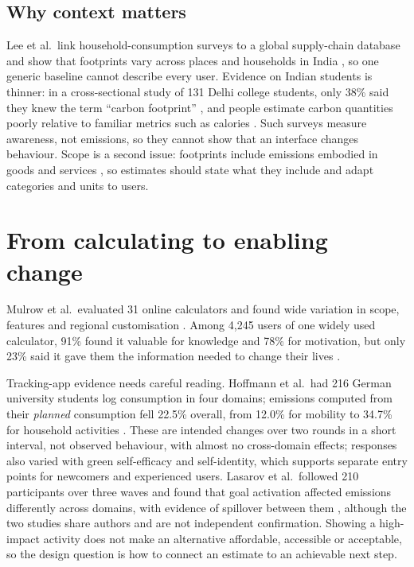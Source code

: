 \documentclass[12pt,a4paper,twocolumn]{article}
\begin{document}
\subsection{Why context matters}
Lee et al.\ link household-consumption surveys to a global supply-chain database and show that footprints vary across places and households in India \cite{lee2021}, so one generic baseline cannot describe every user. Evidence on Indian students is thinner: in a cross-sectional study of 131 Delhi college students, only 38\% said they knew the term ``carbon footprint'' \cite{gandhi2025}, and people estimate carbon quantities poorly relative to familiar metrics such as calories \cite{grinstein2018}. Such surveys measure awareness, not emissions, so they cannot show that an interface changes behaviour. Scope is a second issue: footprints include emissions embodied in goods and services \cite{shi2021}, so estimates should state what they include and adapt categories and units to users.

\section{From calculating to enabling change}
Mulrow et al.\ evaluated 31 online calculators and found wide variation in scope, features and regional customisation \cite{mulrow2019}. Among 4,245 users of one widely used calculator, 91\% found it valuable for knowledge and 78\% for motivation, but only 23\% said it gave them the information needed to change their lives \cite{collins2020}.

Tracking-app evidence needs careful reading. Hoffmann et al.\ had 216 German university students log consumption in four domains; emissions computed from their \emph{planned} consumption fell 22.5\% overall, from 12.0\% for mobility to 34.7\% for household activities \cite{hoffmann2024}. These are intended changes over two rounds in a short interval, not observed behaviour, with almost no cross-domain effects; responses also varied with green self-efficacy and self-identity, which supports separate entry points for newcomers and experienced users. Lasarov et al.\ followed 210 participants over three waves and found that goal activation affected emissions differently across domains, with evidence of spillover between them \cite{lasarov2024}, although the two studies share authors and are not independent confirmation. Showing a high-impact activity does not make an alternative affordable, accessible or acceptable, so the design question is how to connect an estimate to an achievable next step.
\end{document}
